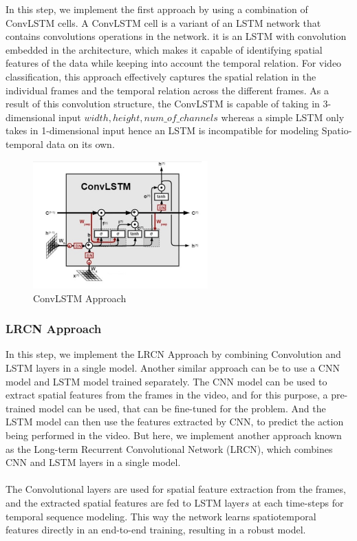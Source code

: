 \documentclass[title page]{article}
\begin{document}
In this step, we implement the first approach by using a combination of ConvLSTM cells. A ConvLSTM cell is a variant of an LSTM network that contains convolutions operations in the network. it is an LSTM with convolution embedded in the architecture, which makes it capable of identifying spatial features of the data while keeping into account the temporal relation. For video classification, this approach effectively captures the spatial relation in the individual frames and the temporal relation across the different frames. As a result of this convolution structure, the ConvLSTM is capable of taking in 3-dimensional input \(width, height, num\_of\_channels\) whereas a simple LSTM only takes in 1-dimensional input hence an LSTM is incompatible for modeling Spatio-temporal data on its own.

\begin{figure}[h]
    \centering
    \includegraphics[width=0.6\textwidth]{Picture2.jpg}
    \caption{ConvLSTM Approach}
    \label{fig:2}
\end{figure}

\subsubsection{LRCN Approach}

In this step, we implement the LRCN Approach by combining Convolution and LSTM layers in a single model. Another similar approach can be to use a CNN model and LSTM model trained separately. The CNN model can be used to extract spatial features from the frames in the video, and for this purpose, a pre-trained model can be used, that can be fine-tuned for the problem. And the LSTM model can then use the features extracted by CNN, to predict the action being performed in the video. But here, we implement another approach known as the Long-term Recurrent Convolutional Network (LRCN), which combines CNN and LSTM layers in a single model. 
\\ \\
The Convolutional layers are used for spatial feature extraction from the frames, and the extracted spatial features are fed to LSTM layer\(s\) at each time-steps for temporal sequence modeling. This way the network learns spatiotemporal features directly in an end-to-end training, resulting in a robust model.
\end{document}
